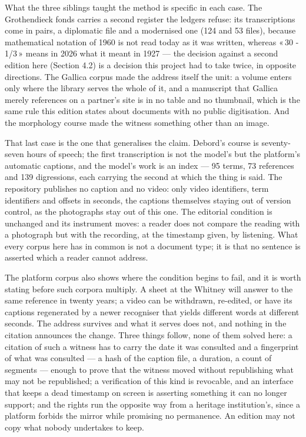 \documentclass[11pt]{article}
\newcommand{\q}[1]{«\,#1\,»}
\begin{document}


What the three siblings taught the method is specific in each case. The
Grothendieck fonds carries a second register the ledgers refuse: its
transcriptions come in pairs, a diplomatic file and a modernised one (124 and 53
files), because mathematical notation of 1960 is not read today as it was
written, whereas \q{30 - 1/3} means in 2026 what it meant in 1927 — the decision
against a second edition here (Section 4.2) is a decision this project had to
take twice, in opposite directions. The Gallica corpus made the address itself
the unit: a volume enters only where the library serves the whole of it, and a
manuscript that Gallica merely references on a partner's site is in no table and
no thumbnail, which is the same rule this edition states about documents with no
public digitisation. And the morphology course made the witness something other
than an image.

That last case is the one that generalises the claim. Debord's course is
seventy-seven hours of speech; the first transcription is not the model's but
the platform's automatic captions, and the model's work is an index — 95 terms,
73 references and 139 digressions, each carrying the second at which the thing
is said. The repository publishes no caption and no video: only video
identifiers, term identifiers and offsets in seconds, the captions themselves
staying out of version control, as the photographs stay out of this one. The
editorial condition is unchanged and its instrument moves: a reader does not
compare the reading with a photograph but with the recording, at the timestamp
given, by listening. What every corpus here has in common is not a document
type; it is that no sentence is asserted which a reader cannot address.

The platform corpus also shows where the condition begins to fail, and it is
worth stating before such corpora multiply. A sheet at the Whitney will answer
to the same reference in twenty years; a video can be withdrawn, re-edited, or
have its captions regenerated by a newer recogniser that yields different words
at different seconds. The address survives and what it serves does not, and
nothing in the citation announces the change. Three things follow, none of them
solved here: a citation of such a witness has to carry the date it was consulted
and a fingerprint of what was consulted — a hash of the caption file, a
duration, a count of segments — enough to prove that the witness moved without
republishing what may not be republished; a verification of this kind is
revocable, and an interface that keeps a dead timestamp on screen is asserting
something it can no longer support; and the rights run the opposite way from a
heritage institution's, since a platform forbids the mirror while promising no
permanence. An edition may not copy what nobody undertakes to keep.
\end{document}
